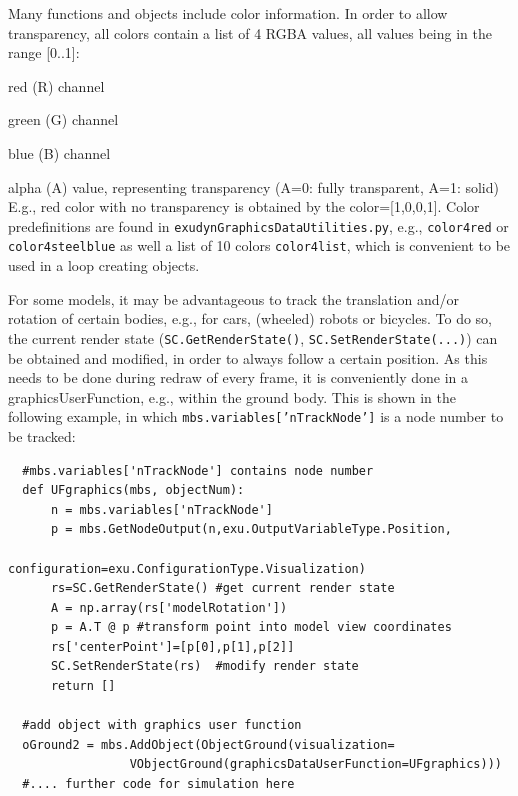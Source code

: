 Many functions and objects include color information. In order to allow transparency, all colors contain a list of 4 RGBA values, all values being in the range [0..1]:
\bi
  \item red (R) channel 
  \item green (G) channel  
  \item blue (B) channel 
  \item alpha (A) value, representing transparency (A=0: fully transparent, A=1: solid)
\ei
E.g., red color with no transparency is obtained by the color=[1,0,0,1]. Color predefinitions are found in \texttt{exudynGraphicsDataUtilities.py}, e.g., \texttt{color4red} or \texttt{color4steelblue} as well a list of 10 colors \texttt{color4list}, which is convenient to be used in a loop creating objects.

\label{secInteractModelView}
For some models, it may be advantageous to track the translation and/or rotation of certain bodies, e.g., for cars, (wheeled) robots or bicycles. 
To do so, the current render state (\texttt{SC.GetRenderState()}, \texttt{SC.SetRenderState(...)}) can be obtained and modified, in order to always follow a certain position.
As this needs to be done during redraw of every frame, it is conveniently done in a graphicsUserFunction, e.g., within the ground body. This is shown in the following example, in which \texttt{mbs.variables['nTrackNode']} is a node number to be tracked:
%
\pythonstyle\begin{lstlisting}
  #mbs.variables['nTrackNode'] contains node number
  def UFgraphics(mbs, objectNum):
      n = mbs.variables['nTrackNode']
      p = mbs.GetNodeOutput(n,exu.OutputVariableType.Position, 
                            configuration=exu.ConfigurationType.Visualization)
      rs=SC.GetRenderState() #get current render state
      A = np.array(rs['modelRotation'])
      p = A.T @ p #transform point into model view coordinates
      rs['centerPoint']=[p[0],p[1],p[2]]
      SC.SetRenderState(rs)  #modify render state
      return []

  #add object with graphics user function
  oGround2 = mbs.AddObject(ObjectGround(visualization=
                 VObjectGround(graphicsDataUserFunction=UFgraphics)))
  #.... further code for simulation here
\end{lstlisting}

